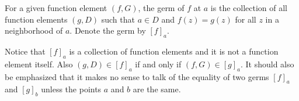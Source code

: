 For a given function element $(f, G)$, the germ of $f$ at $a$ is the collection of all function elements $(g, D)$ such that $a \in D$ and $f(z) = g(z)$ for all $z$ in a neighborhood of $a$. Denote the germ by $[f]_a$.

Notice that $[f]_a$ is a collection of function elements and it is not a function element itself. Also $(g, D) \in [f]_a$ if and only if $(f, G) \in [g]_a$. It should also be emphasized that it makes no sense to talk of the equality of two germs $[f]_a$ and $[g]_b$ unless the points $a$ and $b$ are the same.
